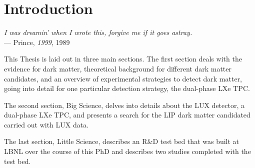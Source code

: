 \chapter{Introduction}\label{ch:introduction} %

\begin{flushright}{\slshape    
    I was dreamin' when I wrote this, forgive me if it goes astray. } \\ \medskip
    --- {Prince, \textit{1999}, 1989}
\end{flushright}

This Thesis is laid out in three main sections. The first section deals with the evidence for dark matter, theoretical background for different dark matter candidates, and an overview of experimental strategies to detect dark matter, going into detail for one particular detection strategy, the dual-phase \ac{LXe} \ac{TPC}.

The second section, Big Science, delves into details about the \ac{LUX} detector, a dual-phase \ac{LXe} \ac{TPC}, and presents a search for the \ac{LIP} dark matter candidated carried out with \ac{LUX} data.

The last section, Little Science, describes an R\&D test bed that was built at \ac{LBNL} over the course of this PhD and describes two studies completed with the test bed. 



